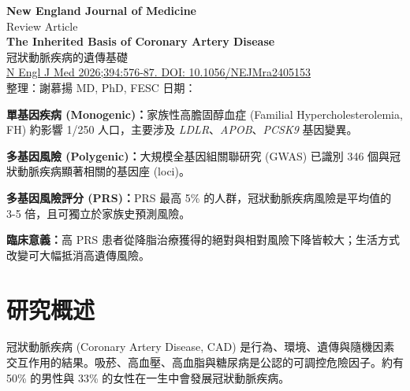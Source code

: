 \documentclass[12pt,a4paper]{article}
\begin{document}

\begin{center}
{\LARGE\bfseries\textcolor{emergency_red}{New England Journal of Medicine}}\\[0.3cm]
{\large\textcolor{emergency_gray}{Review Article}}\\[0.5cm]
{\Large\textbf{The Inherited Basis of Coronary Artery Disease}}\\[0.3cm]
{\large 冠狀動脈疾病的遺傳基礎}\\[0.5cm]
{\normalsize \href{https://doi.org/10.1056/NEJMra2405153}{N Engl J Med 2026;394:576-87. DOI: 10.1056/NEJMra2405153}}\\[0.3cm]
{\normalsize 整理：謝慕揚 MD, PhD, FESC \quad 日期：\mydate}
\end{center}

\vspace{0.5cm}


\begin{tcolorbox}[colback=yellow!10!white,colframe=orange!75!black,title=核心發現摘要]
\textbf{單基因疾病 (Monogenic)：}家族性高膽固醇血症 (Familial Hypercholesterolemia, FH) 約影響 1/250 人口，主要涉及 \textit{LDLR}、\textit{APOB}、\textit{PCSK9} 基因變異。

\textbf{多基因風險 (Polygenic)：}大規模全基因組關聯研究 (GWAS) 已識別 346 個與冠狀動脈疾病顯著相關的基因座 (loci)。

\textbf{多基因風險評分 (PRS)：}PRS 最高 5\% 的人群，冠狀動脈疾病風險是平均值的 3-5 倍，且可獨立於家族史預測風險。

\textbf{臨床意義：}高 PRS 患者從降脂治療獲得的絕對與相對風險下降皆較大；生活方式改變可大幅抵消高遺傳風險。
\end{tcolorbox}

\tableofcontents
\newpage

\section{研究概述}

冠狀動脈疾病 (Coronary Artery Disease, CAD) 是行為、環境、遺傳與隨機因素交互作用的結果。吸菸、高血壓、高血脂與糖尿病是公認的可調控危險因子。約有 50\% 的男性與 33\% 的女性在一生中會發展冠狀動脈疾病。
\end{document}
